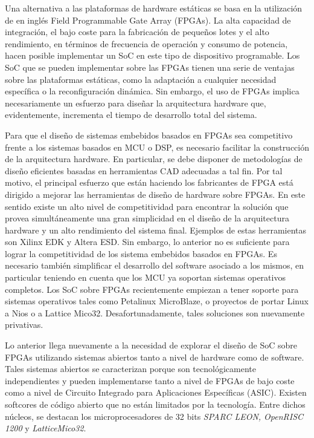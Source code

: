 Una alternativa a las plataformas de hardware estáticas se basa en la
utilización de en inglés Field Programmable Gate Array (FPGAs). La alta capacidad de integración, el bajo coste
para la fabricación de pequeños lotes y el alto rendimiento, en
términos de frecuencia de operación y consumo de potencia, hacen
posible implementar un SoC en este tipo de dispositivo
programable. Los SoC que se pueden implementar sobre las FPGAs tienen
una serie de ventajas sobre las plataformas estáticas, como la
adaptación a cualquier necesidad específica o la reconfiguración
dinámica. Sin embargo, el uso de FPGAs implica necesariamente un
esfuerzo para diseñar la arquitectura hardware que, evidentemente,
incrementa el tiempo de desarrollo total del sistema.

Para que el diseño de sistemas embebidos basados en FPGAs sea
competitivo frente a los sistemas basados en MCU o DSP, es necesario
facilitar la construcción de la arquitectura hardware. En particular,
se debe disponer de metodologías de diseño eficientes basadas en
herramientas CAD adecuadas a tal fin. Por tal motivo, el principal
esfuerzo que están haciendo los fabricantes de FPGA está dirigido a
mejorar las herramientas de diseño 
de hardware sobre FPGAs. En este sentido
existe un alto nivel de competitividad para encontrar la solución que
provea simultáneamente una gran simplicidad en el diseño de la
arquitectura hardware y un alto rendimiento del sistema
final. Ejemplos de estas herramientas son Xilinx EDK y Altera ESD. Sin
embargo, lo anterior no es suficiente para lograr la competitividad de
los sistema embebidos basados en FPGAs. Es necesario también
simplificar el desarrollo del software asociado a los mismos, en
particular teniendo en cuenta que los MCU ya soportan sistemas
operativos completos. Los SoC sobre FPGAs recientemente empiezan a
tener soporte para sistemas operativos tales como Petalinux
MicroBlaze, o proyectos de portar Linux a Nios o a Lattice
Mico32. Desafortunadamente, tales soluciones son nuevamente
privativas.

Lo anterior llega nuevamente a la necesidad de explorar el diseño de
SoC sobre FPGAs utilizando sistemas abiertos tanto a nivel de hardware
como de software. Tales sistemas abiertos se caracterizan porque son
tecnológicamente independientes y pueden implementarse tanto a
nivel de FPGAs de bajo coste como a nivel de Circuito Integrado para Aplicaciones Específicas (ASIC). Existen softcores
de código abierto que no están limitados por la tecnología. Entre
dichos núcleos, se destacan los microprocesadores de 32 bits
\textit{SPARC LEON, OpenRISC 1200} y \textit{LatticeMico32}.


